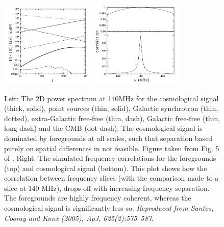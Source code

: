 \begin{figure}
\begin{center}
    \includegraphics[width=0.4\textwidth]{Chapman_Jelic/Images/santos_spat.png}
    \includegraphics[width=0.4\textwidth]{Chapman_Jelic/Images/santos_freq.png}
\end{center}
    \caption{Left: The 2D power spectrum at 140MHz for the cosmological signal (thick, solid), point sources (thin, solid), Galactic synchrotron (thin, dotted), extra-Galactic free-free (thin, dash), Galactic free-free (thin, long dash) and the CMB (dot-dash). The cosmological signal is dominated by foregrounds at all scales, such that separation based purely on spatial differences in not feasible. Figure taken from Fig. 5 of \cite{Santos2005ApJ...625..575S}. Right: The simulated frequency correlations for the foregrounds (top) and cosmological signal (bottom). This plot shows how the correlation between frequency slices (with the comparison made to a slice at 140 MHz), drops off with increasing frequency separation. The foregrounds are highly frequency coherent, whereas the cosmological signal is significantly less so. \textit{Reproduced from Santos, Cooray and Knox (2005), ApJ, 625(2):575--587}.}
    \label{fig:santos_spatial}
\end{figure}

